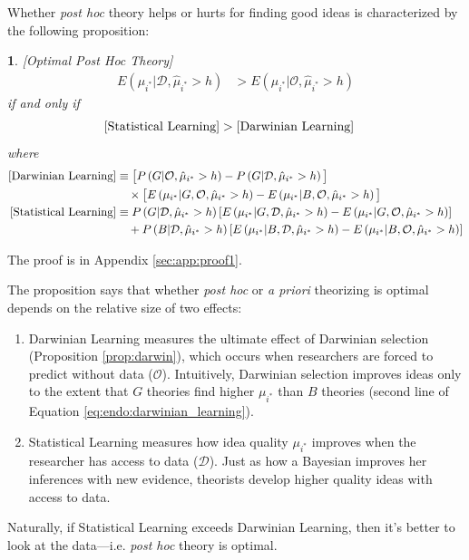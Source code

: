 \documentclass[12pt,english]{article}
\theoremstyle{plain}
\theoremstyle{plain}
\newtheorem{prop}[thm]{\protect\propositionname}
\providecommand{\propositionname}{Proposition}
\providecommand{\propositionname}{Proposition}
\begin{document}
Whether \emph{post hoc} theory helps or hurts for finding good ideas is characterized by the following proposition:
\begin{prop}\label{prop:optimal_post_hoc}
{[}Optimal Post Hoc Theory{]}
\begin{align}
E\left(\mu_{i^{\ast}}|\mathcal{\mathcal{D}},\hat{\mu}_{i^{\ast}}>h\right) & >E\left(\mu_{i^{\ast}}|\mathcal{O},\hat{\mu}_{i^{\ast}}>h\right)
\end{align}
if and only if 
\begin{align}
\text{\ensuremath{\left[\text{Statistical Learning}\right]}} & >\left[\text{Darwinian Learning}\right]
\end{align}
where 
\begin{align}
\left[\text{Darwinian Learning}\right] 
& \equiv
    \big[
        P\left(G|\mathcal{O},\hat{\mu}_{i^{\ast}}>h\right)-
    P\left(G|\mathcal{D},\hat{\mu}_{i^{\ast}}>h\right)
    \big]
    \notag
    \\
& \quad\times
\big[
    E\left(\mu_{i^{\ast}}|G,\mathcal{O},\hat{\mu}_{i^{\ast}}>h\right) - 
    E\left(\mu_{i^{\ast}}|B,\mathcal{O},\hat{\mu}_{i^{\ast}}>h\right)
\big] 
\label{eq:endo:darwinian_learning} \\
\left[\text{Statistical Learning}\right] & 
\equiv 
P\left(G|\mathcal{D}, \hat{\mu}_{i^{\ast}}>h\right)\left[
    E\left(\mu_{i^{\ast}}|G,\mathcal{D}, \hat{\mu}_{i^{\ast}}>h\right) - 
    E\left(\mu_{i^{\ast}}|G,\mathcal{O}, \hat{\mu}_{i^{\ast}}>h\right)
\right] \notag \\ 
& \quad +
P\left(B|\mathcal{D}, \hat{\mu}_{i^{\ast}}>h\right)\left[
    E\left(\mu_{i^{\ast}}|B,\mathcal{D}, \hat{\mu}_{i^{\ast}}>h\right) - 
    E\left(\mu_{i^{\ast}}|B,\mathcal{O}, \hat{\mu}_{i^{\ast}}>h\right)
\right]
\label{eq:endo:statistical_learning}
\end{align}
\end{prop}
The proof is in Appendix \ref{sec:app:proof1}.

The proposition says that whether \emph{post hoc} or \emph{a priori}  theorizing is optimal depends on the relative size of two effects:
\begin{enumerate}
    \item Darwinian Learning measures the ultimate effect of Darwinian selection (Proposition \ref{prop:darwin}), which occurs when researchers are forced to predict without data ($\mathcal{O}$).  Intuitively, Darwinian selection improves ideas only to the extent that $G$ theories find higher $\mu_{i^\ast}$ than $B$ theories (second line of Equation \eqref{eq:endo:darwinian_learning}). 
    \item Statistical Learning measures how idea quality $\mu_{i^{\ast}}$ improves when the researcher has access to data ($\mathcal{D}$). Just as how a Bayesian improves her inferences with new evidence, theorists develop higher quality ideas with access to data. 
\end{enumerate}
Naturally, if Statistical Learning exceeds Darwinian Learning, then it's better to look at the data---i.e. \emph{post hoc} theory is optimal.
\end{document}
